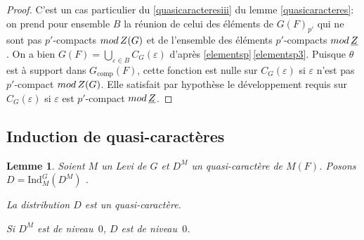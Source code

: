 \documentclass[11pt]{article}
\newcommand{\Subsection}{\subsection}
\numberwithin{equation}{section}\providecommand{\og}{«\,}\providecommand{\fg}{\,»}
\let\oldenumerate\enumerate
\renewcommand{\enumerate}{\oldenumerate\itemindent0pt}
\newenvironment{enumeratei}
{\bgroup\def\theenumi{\roman{enumi}}\def\theenumii{\arabic{enumii}}\oldenumerate}
{\endenumerate\egroup}
\let\epsilon\varepsilon
\newcommand{\rmod}{\textup{mod}\,}
\newcommand{\comp}{\mathrm{comp}}
\newcommand{\Ind}{\mathrm{Ind}}
\theoremstyle{plain}
\newtheorem*{lem*}{Lemme}
\theoremstyle{definition}
\begin{document}
\begin{proof}
C'est un cas particulier du \eqref{quasicaracteresiii} du lemme \ref{quasicaracteres}: on prend pour ensemble $B$ la réunion de celui des éléments de $G(F)_{p'}$ qui ne sont pas $p'$-compacts $\rmod Z(G)$ et de l'ensemble des éléments $p'$-compacts $\rmod \underline{Z}$. On a bien $G(F)=\bigcup_{\epsilon\in B}C_{G}(\epsilon)$ d'après \ref{elementsp}\,\eqref{elementsp3}. Puisque $\theta$ est à support dans $G_{\comp}(F)$, cette fonction est nulle sur $C_{G}(\epsilon)$ si $\epsilon$ n'est pas $p'$-compact $\rmod Z(G)$. Elle satisfait par hypothèse le développement requis sur $C_{G}(\epsilon)$ si $\epsilon$ est $p'$-compact $\rmod \underline{Z}$.
\end{proof}

\Subsection{Induction de quasi-caractères}\label{induction}

\begin{lem*}
Soient $M$ un Levi de $G$ et $D^M$ un quasi-caractère de $M(F)$. Posons $D= \Ind_{M}^G(D^M)$ .
\begin{enumeratei}
\item\label{inductioni}
La distribution $D$ est un quasi-caractère.

\item\label{inductionii}
Si $D^M$ est de niveau~$0$, $D$ est de niveau~$0$.
\end{enumeratei}
\end{lem*}
\end{document}
